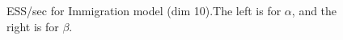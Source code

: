 \begin{figure}
\begin{minipage}[hp]{0.45\linewidth}
    \vspace{-0 in}
     \label{fig:ESS_Q_D10}
  \end{minipage}
    \caption{ESS/sec for Immigration model (dim 10).The left is for $\alpha$, and the right is for $\beta$.}
  \end{figure}


